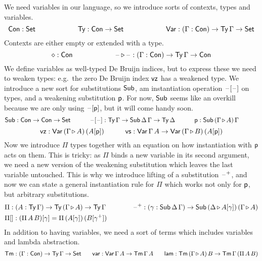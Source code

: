 \documentclass{easychair}
\begin{document}
We need variables in our language, so we introduce sorts of contexts,
types and variables.
\[
 \mathsf{Con} : \mathsf{Set} \hspace{6em} \mathsf{Ty} : \mathsf{Con}\rightarrow\mathsf{Set} \hspace{6em} \mathsf{Var} : (\Gamma:\mathsf{Con})\rightarrow\mathsf{Ty}\,\Gamma\rightarrow\mathsf{Set}  \\
\]
Contexts are either empty or extended with a type.
\[
\diamond : \mathsf{Con} \hspace{6em} \mathord{\hspace{1pt}\text{--}\hspace{1pt}}\mathop{\triangleright}\mathord{\hspace{1pt}\text{--}\hspace{1pt}} : (\Gamma:\mathsf{Con})\rightarrow\mathsf{Ty}\,\Gamma\rightarrow\mathsf{Con}
\]
We define variables as well-typed De Bruijn indices, but to express
these we need to weaken types: e.g.\ the zero De Bruijn index $\mathsf{vz}$
has a weakened type. We introduce a new sort for substitutions $\mathsf{Sub}$,
am instantiation operation $\mathord{\hspace{1pt}\text{--}\hspace{1pt}}[\mathord{\hspace{1pt}\text{--}\hspace{1pt}}]$ on types, and a weakening
substitution $\mathsf{p}$. For now, $\mathsf{Sub}$ seems like an overkill because we
are only using $\mathord{\hspace{1pt}\text{--}\hspace{1pt}}[\mathsf{p}]$, but it will come handy soon.
\[
\mathsf{Sub}: \mathsf{Con}\rightarrow\mathsf{Con}\rightarrow\mathsf{Set} \hspace{3em} \mathord{\hspace{1pt}\text{--}\hspace{1pt}}[\mathord{\hspace{1pt}\text{--}\hspace{1pt}}] : \mathsf{Ty}\,\Gamma\rightarrow\mathsf{Sub}\,\Delta\,\Gamma\rightarrow\mathsf{Ty}\,\Delta \hspace{3em} \mathsf{p} : \mathsf{Sub}\,(\Gamma\mathop{\triangleright} A)\,\Gamma \hspace{3em}
\]
\[
\mathsf{vz} : \mathsf{Var}\,(\Gamma\mathop{\triangleright} A)\,(A[\mathsf{p}]) \hspace{3em} \mathsf{vs} : \mathsf{Var}\,\Gamma\,A\rightarrow\mathsf{Var}\,(\Gamma\mathop{\triangleright} B)\,(A[\mathsf{p}])
\]
Now we introduce $\Pi$ types together with an equation on how
instantiation with $\mathsf{p}$ acts on them. This is tricky: as $\Pi$ binds a
new variable in its second argument, we need a new version of the
weakening substitution which leaves the last variable untouched. This
is why we introduce lifting of a substitution $\mathord{\hspace{1pt}\text{--}\hspace{1pt}}^{+}$, and now we
can state a general instantiation rule for $\Pi$ which works not only
for $\mathsf{p}$, but arbitrary substitutions.
\begin{alignat*}{10}
& \Pi:(A:\Ty\,\Gamma)\ra\Ty\,(\Gamma\ext A)\ra\Ty\,\Gamma \hspace{3em} && \blank^+ : (\gamma:\Sub\,\Delta\,\Gamma)\ra\Sub\,(\Delta\ext A[\gamma])\,(\Gamma\ext A) \\
& \Pi[] : (\Pi\,A\,B)[\gamma] = \Pi\,(A[\gamma])\,(B[\gamma^+])
\end{alignat*}
In addition to having variables, we need a sort of terms which
includes variables and lambda abstraction.
\[
\mathsf{Tm} : (\Gamma:\mathsf{Con})\rightarrow\mathsf{Ty}\,\Gamma\rightarrow\mathsf{Set} \hspace{1.8em} \mathsf{var} : \mathsf{Var}\,\Gamma\,A\rightarrow\mathsf{Tm}\,\Gamma\,A \hspace{1.8em} \mathsf{lam} : \mathsf{Tm}\,(\Gamma\mathop{\triangleright} A)\,B\rightarrow\mathsf{Tm}\,\Gamma\,(\Pi\,A\,B)  \\
\]
\end{document}
